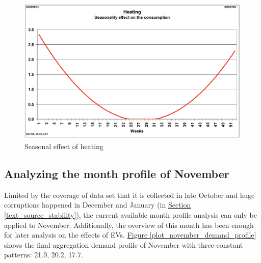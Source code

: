 \documentclass[12pt,a4paper]{report}
\begin{document}
                \begin{figure}[ht]
                    \centerline{\includegraphics[scale=1]{heating_season_effect}}
                    \caption{Seasonal effect of heating}
                    \label{plot_heating_season_effect}
                \end{figure}

                \subsection{Analyzing the month profile of November}
                    Limited by the coverage of data set that it is collected in late October and huge corruptions happened in December and January (in \hyperref[text_source_stability]{Section \ref*{text_source_stability}}), the current available month profile analysis can only be applied to November. Additionally, the overview of this month has been enough for later analysis on the effects of EVs.
                    \hyperref[plot_november_demand_profile]{Figure \ref*{plot_november_demand_profile}} shows the final aggregation demand profile of November with three constant patterns: 21.9, 20.2, 17.7.
\end{document}
